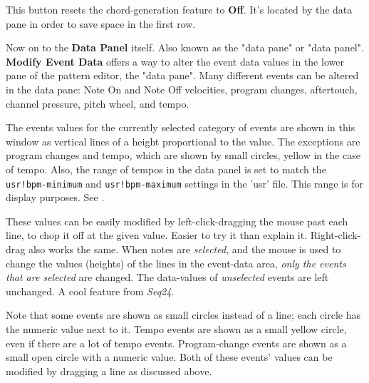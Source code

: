    This button resets the chord-generation feature to \textbf{Off}.
   It's located by the data pane in order to save space in the first row.

   Now on to the \textbf{Data Panel} itself.
   Also known as the "data pane"
   or "data panel".
   \textbf{Modify Event Data} offers a way to
   alter the event data values in 
   the lower pane of the pattern editor, the "data pane".
   Many different events can be altered in the data pane:
   Note On and Note Off velocities, program changes, aftertouch, channel
   pressure, pitch wheel, and tempo.

   The events values for the currently selected category of events are shown
   in this window as vertical lines of a height proportional to the value.
   The exceptions are program changes and tempo, which are shown by small
   circles, yellow in the case of tempo.
   Also, the range of tempos in the data panel is set to match the
   \texttt{usr!bpm-minimum}
   and
   \texttt{usr!bpm-maximum}
   settings in the 'usr' file.
   This range is for display purposes.
   See .

   These values can be easily modified by
   left-click-dragging the
   mouse past each line, to chop it off at the given value.  Easier to try
   it than explain it.
   Right-click-drag also works the same.
   When notes are \textsl{selected}, and the
   mouse is used to change the values (heights) of the lines in the event-data
   area, \textsl{only the events that are selected} are changed.
   The data-values of \textsl{unselected} events are left unchanged.
   A cool feature from \textsl{Seq24}.

   Note that some events are shown as small circles instead of a line; each
   circle has the numeric value next to it.
   Tempo events are shown as a small yellow circle, even if there are a lot of
   tempo events.
   Program-change events are shown as a small open circle with a numeric value.
   Both of these events' values can be modified by dragging a line as discussed
   above.

   
